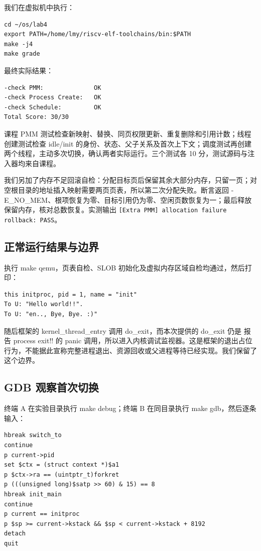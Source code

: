 \documentclass[UTF8,a4paper,10pt]{ctexart}
\begin{document}
我们在虚拟机中执行：


\begin{lstlisting}
cd ~/os/lab4
export PATH=/home/lmy/riscv-elf-toolchains/bin:$PATH
make -j4
make grade
\end{lstlisting}

最终实际结果：


\begin{lstlisting}
-check PMM:              OK
-check Process Create:   OK
-check Schedule:         OK
Total Score: 30/30
\end{lstlisting}

课程 PMM 测试检查新映射、替换、同页权限更新、重复删除和引用计数；线程创建测试检查 idle/init 的身份、状态、父子关系及首次上下文；调度测试再创建两个线程，主动多次切换，确认两者实际运行。三个测试各 10 分，测试源码与注入器均来自课程。


我们另加了内存不足回滚自检：分配目标页后保留其余大部分内存，只留一页；对空根目录的地址插入映射需要两页页表，所以第二次分配失败。断言返回 -E\_NO\_MEM、根项恢复为零、目标引用仍为零、空闲页数恢复为一；最后释放保留内存，核对总数恢复。实测输出 \nolinkurl{[Extra PMM] allocation failure rollback: PASS}。


\subsection{正常运行结果与边界}

执行 make qemu，页表自检、SLOB 初始化及虚拟内存区域自检均通过，然后打印：


\begin{lstlisting}
this initproc, pid = 1, name = "init"
To U: "Hello world!!".
To U: "en.., Bye, Bye. :)"
\end{lstlisting}

随后框架的 kernel\_thread\_entry 调用 do\_exit，而本次提供的 do\_exit 仍是 报告 process exit!! 的 panic 调用，所以进入内核调试监视器。这是框架的退出占位行为，不能据此宣称完整进程退出、资源回收或父进程等待已经实现。我们保留了这个边界。


\subsection{GDB 观察首次切换}

终端 A 在实验目录执行 make debug；终端 B 在同目录执行 make gdb，然后逐条输入：


\begin{lstlisting}
hbreak switch_to
continue
p current->pid
set $ctx = (struct context *)$a1
p $ctx->ra == (uintptr_t)forkret
p (((unsigned long)$satp >> 60) & 15) == 8
hbreak init_main
continue
p current == initproc
p $sp >= current->kstack && $sp < current->kstack + 8192
detach
quit
\end{lstlisting}
\end{document}
